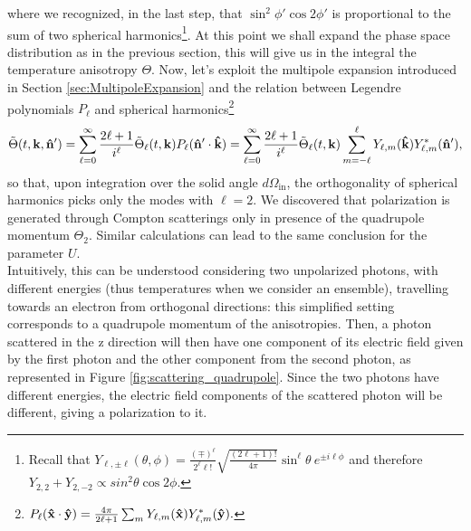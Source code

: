 where we recognized, in the last step, that $\sin^2\phi'\cos2\phi'$ is proportional to the sum of two spherical harmonics\footnote{Recall that $Y_{\ell,\pm\ell}(\theta,\phi)=\frac{(\mp)^\ell}{2^\ell\ell!}\sqrt{\frac{(2\ell+1)!}{4\pi}}\sin^\ell\theta\ e^{\pm i\ell\phi}$ and therefore $Y_{2,2}+Y_{2,-2}\propto sin^2\theta\cos2\phi$.}. At this point we shall expand the phase space distribution as in the previous section, this will give us in the integral the temperature anisotropy $\Theta$. Now, let's exploit the multipole expansion introduced in Section \ref{sec:MultipoleExpansion} and the relation between Legendre polynomials $P_\ell$ and spherical harmonics\footnote{$P_\ell(\mathbf{\hat{x}}\cdot\mathbf{\hat{y}})=\frac{4\pi}{2\ell+1}\sum_{m}Y_{\ell,m}(\mathbf{\hat{x}})Y_{\ell,m}^*(\mathbf{\hat{y}}).$}
$$\tilde\Theta(t,\mathbf{k}, \mathbf{\hat{n}}')=\sum_{\ell=0}^{\infty}\frac{2\ell+1}{i^\ell}\tilde\Theta_\ell(t,\mathbf k)P_\ell(\mathbf{\hat{n}}'\cdot \mathbf{\hat{k}})=\sum_{\ell=0}^{\infty}\frac{2\ell+1}{i^\ell}\tilde\Theta_\ell(t,\mathbf k)\sum_{m=-\ell}^\ell Y_{\ell,m}(\mathbf{\hat{k}})Y_{\ell,m}^*(\mathbf{\hat{n}}'), $$
so that, upon integration over the solid angle $d\Omega_\text{in}$, the orthogonality of spherical harmonics picks only the modes with $\ell=2$. We discovered that polarization is generated through Compton scatterings only in presence of the quadrupole momentum $\Theta_2$. Similar calculations can lead to the same conclusion for the parameter $U$.\\ Intuitively, this can be understood considering two unpolarized photons, with different energies (thus temperatures when we consider an ensemble), travelling towards an electron from orthogonal directions: this simplified setting corresponds to a quadrupole momentum of the anisotropies. Then, a photon scattered in the z direction will then have one component of its electric field given by the first photon and the other component from the second photon, as represented in Figure \ref{fig:scattering_quadrupole}. Since the two photons have different energies, the electric field components of the scattered photon will be different, giving a polarization to it. 

